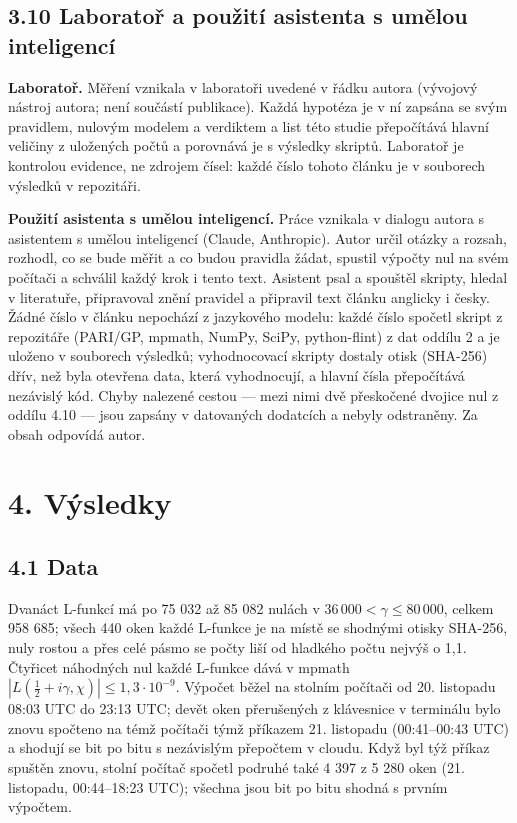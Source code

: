 \documentclass[
  10pt,
]{article}
\begin{document}
\hypertarget{laboratoux159-a-pouux17eituxed-asistenta-s-umux11blou-inteligencuxed}{%
\subsection{3.10 Laboratoř a použití asistenta s umělou
inteligencí}\label{laboratoux159-a-pouux17eituxed-asistenta-s-umux11blou-inteligencuxed}}

\textbf{Laboratoř.} Měření vznikala v laboratoři uvedené v řádku autora
(vývojový nástroj autora; není součástí publikace). Každá hypotéza je v
ní zapsána se svým pravidlem, nulovým modelem a verdiktem a list této
studie přepočítává hlavní veličiny z uložených počtů a porovnává je s
výsledky skriptů. Laboratoř je kontrolou evidence, ne zdrojem čísel:
každé číslo tohoto článku je v souborech výsledků v repozitáři.

\textbf{Použití asistenta s umělou inteligencí.} Práce vznikala v
dialogu autora s asistentem s umělou inteligencí (Claude, Anthropic).
Autor určil otázky a rozsah, rozhodl, co se bude měřit a co budou
pravidla žádat, spustil výpočty nul na svém počítači a schválil každý
krok i tento text. Asistent psal a spouštěl skripty, hledal v
literatuře, připravoval znění pravidel a připravil text článku anglicky
i česky. Žádné číslo v článku nepochází z jazykového modelu: každé číslo
spočetl skript z repozitáře (PARI/GP, mpmath, NumPy, SciPy,
python-flint) z dat oddílu 2 a je uloženo v souborech výsledků;
vyhodnocovací skripty dostaly otisk (SHA-256) dřív, než byla otevřena
data, která vyhodnocují, a hlavní čísla přepočítává nezávislý kód. Chyby
nalezené cestou --- mezi nimi dvě přeskočené dvojice nul z oddílu 4.10
--- jsou zapsány v datovaných dodatcích a nebyly odstraněny. Za obsah
odpovídá autor.

\hypertarget{vuxfdsledky}{%
\section{4. Výsledky}\label{vuxfdsledky}}

\hypertarget{data-1}{%
\subsection{4.1 Data}\label{data-1}}

Dvanáct L-funkcí má po 75 032 až 85 082 nulách v
\(36\,000 < \gamma \le 80\,000\), celkem 958 685; všech 440 oken každé
L-funkce je na místě se shodnými otisky SHA-256, nuly rostou a přes celé
pásmo se počty liší od hladkého počtu nejvýš o 1,1. Čtyřicet náhodných
nul každé L-funkce dává v mpmath
\(|L(\tfrac12 + i\gamma, \chi)| \le 1{,}3\cdot10^{-9}\). Výpočet běžel
na stolním počítači od 20. listopadu 08:03 UTC do 23:13 UTC; devět oken
přerušených z klávesnice v terminálu bylo znovu spočteno na témž
počítači týmž příkazem 21. listopadu (00:41--00:43 UTC) a shodují se bit
po bitu s nezávislým přepočtem v cloudu. Když byl týž příkaz spuštěn
znovu, stolní počítač spočetl podruhé také 4 397 z 5 280 oken (21.
listopadu, 00:44--18:23 UTC); všechna jsou bit po bitu shodná s prvním
výpočtem.
\end{document}
